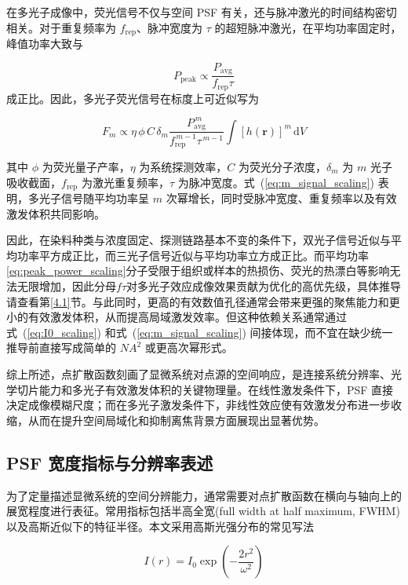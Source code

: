 在多光子成像中，荧光信号不仅与空间 PSF 有关，还与脉冲激光的时间结构密切相关。对于重复频率为 $f_{\mathrm{rep}}$、脉冲宽度为 $\tau$ 的超短脉冲激光，在平均功率固定时，峰值功率大致与

\begin{equation}
  P_{\mathrm{peak}}\propto \frac{P_{\mathrm{avg}}}{f_{\mathrm{rep}}\tau}
  \label{eq:peak_power_scaling}
\end{equation}
成正比。因此，多光子荧光信号在标度上可近似写为

\begin{equation}
  F_m \propto \eta\,\phi\,C\,\delta_m
  \frac{P_{\mathrm{avg}}^{\,m}}{f_{\mathrm{rep}}^{\,m-1}\tau^{\,m-1}}
  \int [h(\mathbf{r})]^m\,\mathrm{d}V
  \label{eq:m_signal_scaling}
\end{equation}

其中 $\phi$ 为荧光量子产率，$\eta$ 为系统探测效率，$C$ 为荧光分子浓度，$\delta_m$ 为 $m$ 光子吸收截面，$f_{\mathrm{rep}}$ 为激光重复频率，$\tau$ 为脉冲宽度。式~(\ref{eq:m_signal_scaling}) 表明，多光子信号随平均功率呈 $m$ 次幂增长，同时受脉冲宽度、重复频率以及有效激发体积共同影响。

因此，在染料种类与浓度固定、探测链路基本不变的条件下，双光子信号近似与平均功率平方成正比，而三光子信号近似与平均功率立方成正比。而平均功率\ref{eq:peak_power_scaling}分子受限于组织或样本的热损伤、荧光的热漂白等影响无法无限增加，因此分母$f\tau$对多光子效应成像效果贡献为优化的高优先级，具体推导请查看第\ref{4.1}节。与此同时，更高的有效数值孔径通常会带来更强的聚焦能力和更小的有效激发体积，从而提高局域激发效率。但这种依赖关系通常通过式~(\ref{eq:I0_scaling}) 和式~(\ref{eq:m_signal_scaling}) 间接体现，而不宜在缺少统一推导前直接写成简单的 $NA^2$ 或更高次幂形式。

综上所述，点扩散函数刻画了显微系统对点源的空间响应，是连接系统分辨率、光学切片能力和多光子有效激发体积的关键物理量。在线性激发条件下，PSF 直接决定成像模糊尺度；而在多光子激发条件下，非线性效应使有效激发分布进一步收缩，从而在提升空间局域化和抑制离焦背景方面展现出显著优势。



\subsection{PSF 宽度指标与分辨率表述}\label{2.2.2}
为了定量描述显微系统的空间分辨能力，通常需要对点扩散函数在横向与轴向上的展宽程度进行表征。常用指标包括半高全宽(full width at half maximum, FWHM)以及高斯近似下的特征半径。本文采用高斯光强分布的常见写法

\begin{equation}
  I(r)=I_0\exp\!\left(-\frac{2r^2}{\omega^2}\right)
  \label{eq:gaussian_width_def}
\end{equation}

